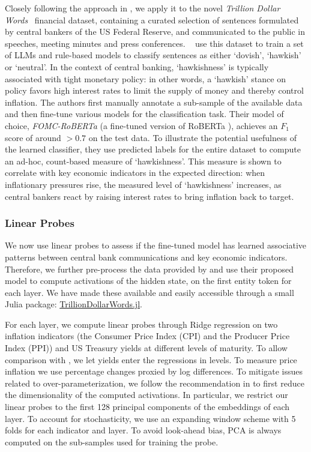 Closely following the approach in \citet{gurnee2023languagev2}, we apply it to the novel \emph{Trillion Dollar Words}~\citep{shah2023trillion} financial dataset, containing a curated selection of sentences formulated by central bankers of the US Federal Reserve, and communicated to the public in speeches, meeting minutes and press conferences. ~\citep{shah2023trillion} use this dataset to train a set of LLMs and rule-based models to classify sentences as either `dovish', `hawkish' or `neutral'. In the context of central banking, `hawkishness' is typically associated with tight monetary policy: in other words, a `hawkish' stance on policy favors high interest rates to limit the supply of money and thereby control inflation. The authors first manually annotate a sub-sample of the available data and then fine-tune various models for the classification task. Their model of choice, \emph{FOMC-RoBERTa} (a fine-tuned version of RoBERTa \citep{liu2019roberta}), achieves an \(F_1\) score of around \(>0.7\) on the test data. To illustrate the potential usefulness of the learned classifier, they use predicted labels for the entire dataset to compute an ad-hoc, count-based measure of `hawkishness'. This measure is shown to correlate with key economic indicators in the expected direction: when inflationary pressures rise, the measured level of `hawkishness' increases, as central bankers react by raising interest rates to bring inflation back to target.

\subsubsection{Linear Probes}\label{linear-probes}
We now use linear probes to assess if the fine-tuned model has learned associative patterns between central bank communications and key economic indicators. Therefore, we further pre-process the data provided by \citet{shah2023trillion} and use their proposed model to compute activations of the hidden state, on the first entity token for each layer. We have made these available and easily accessible through a small Julia package: \href{https://anonymous.4open.science/r/TrillionDollarWords/README.md}{TrillionDollarWords.jl}. 

For each layer, we compute linear probes through Ridge regression on two inflation indicators (the Consumer Price Index (CPI) and the Producer Price Index (PPI)) and US Treasury yields at different levels of maturity. To allow comparison with \citet{shah2023trillion}, we let yields enter the regressions in levels. To measure price inflation we use percentage changes proxied by log differences. To mitigate issues related to over-parameterization, we follow the recommendation in \citet{alain2018understanding} to first reduce the dimensionality of the computed activations. In particular, we restrict our linear probes to the first 128 principal components of the embeddings of each layer. To account for stochasticity, we use an expanding window scheme with 5 folds for each indicator and layer. To avoid look-ahead bias, PCA is always computed on the sub-samples used for training the probe. 

